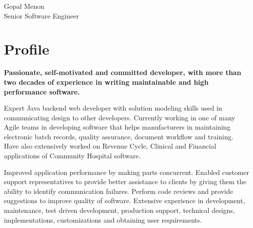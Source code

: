 \documentclass[10pt]{article} %
\begin{document}
\begin{paracol}{2} %


\parbox[top][0.12\textheight][c]{\linewidth}{ %
	\vspace{-0.04\textheight} %
	\centering %
	{\sffamily\Huge Gopal Menon}\\\medskip %
	{\Huge\color{headings} Senior Software Engineer}
}


\section{Profile}

{\raggedright\textbf{Passionate, self-motivated and committed developer, with more than two decades of experience in writing maintainable and high performance software.}\\\medskip}
Expert Java backend web developer with solution modeling skills used in communicating design to other developers. Currently
working in one of many Agile teams in developing software that helps manufacturers in maintaining electronic batch records, quality assurance, document workflow and training. Have also extensively worked on Revenue Cycle, Clinical and Financial applications of Community Hospital software.\\\medskip

Improved application performance by making parts concurrent. Enabled customer support representatives to provide better assistance to clients by giving them the ability to identify communication failures. Perform code reviews and provide suggestions to improve quality of software. Extensive experience in development, maintenance, test driven development, production support, technical designs, implementations, customizations and obtaining user requirements.\\\medskip


\end{paracol}
\end{document}
